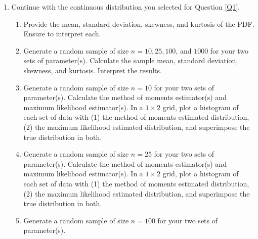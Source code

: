 \documentclass{article}\usepackage[]{graphicx}\usepackage[]{color}
\begin{document}
\begin{enumerate}
\item Continue with the continuous distribution you selected for Question \ref{Q1}.
\begin{enumerate}
  \item Provide the mean, standard deviation, skewness, and kurtosis of the PDF.
  Ensure to interpret each.
  \item Generate a random sample of size $n=10, 25, 100$, and $1000$ for your 
  two sets of parameter(s). Calculate the sample mean, standard deviation, 
  skewness, and kurtosis. Interpret the results.
  \item Generate a random sample of size $n=10$ for your two sets of parameter(s).
  Calculate the method of moments estimator(s) and maximum likelihood estimator(s).
  In a $1 \times 2$ grid, plot a histogram of each set of data with (1) the method 
  of moments estimated distribution, (2) the maximum likelihood estimated 
  distribution, and superimpose the true distribution in both.
  \item Generate a random sample of size $n=25$ for your two sets of parameter(s).
  Calculate the method of moments estimator(s) and maximum likelihood estimator(s). 
  In a $1 \times 2$ grid, plot a histogram of each set of data with (1) the method 
  of moments estimated distribution, (2) the maximum likelihood estimated distribution, 
  and superimpose the true distribution in both.
  \item Generate a random sample of size $n=100$ for your two sets of parameter(s). 

\end{enumerate}
\end{enumerate}
\end{document}

